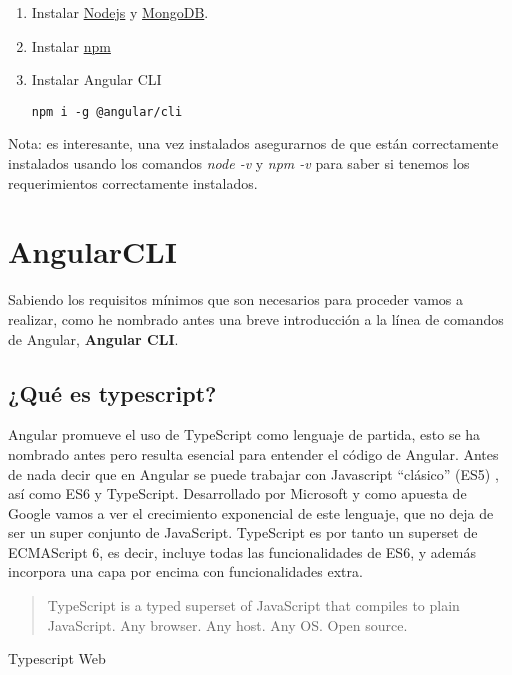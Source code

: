 \begin{enumerate}
	\item Instalar \href{https://nodejs.org/en/}{Nodejs} y \href{https://www.mongodb.com/}{MongoDB}.
	\item Instalar \href{https://www.npmjs.com/}{npm}
	\item Instalar Angular CLI
		\lstset{language=C, breaklines=true, basicstyle=\footnotesize}
		\begin{lstlisting}[frame=single]
		npm i -g @angular/cli
    	\end{lstlisting}
\end{enumerate}

Nota: es interesante, una vez instalados asegurarnos de que están correctamente instalados usando los comandos \emph{node -v} y \emph{npm -v} para saber si tenemos los requerimientos correctamente instalados.


\section{AngularCLI}\label{angularCLI}
Sabiendo los requisitos mínimos que son necesarios para proceder vamos a realizar, como he nombrado antes una breve introducción a la línea de comandos de Angular,  \textbf{Angular CLI}.

\subsection{¿Qué es typescript?}\label{typesript}
Angular  promueve el uso de TypeScript como lenguaje de partida, esto se ha nombrado antes pero resulta esencial para entender el código de Angular. Antes de nada decir que en Angular se puede trabajar con Javascript “clásico” (ES5) \cite{ecma}, así como ES6 y TypeScript. Desarrollado por Microsoft y como apuesta de Google vamos a ver el crecimiento exponencial de este lenguaje, que no deja de ser un super conjunto de JavaScript. 
 TypeScript es por tanto un superset de ECMAScript 6, es decir, incluye todas las funcionalidades de ES6, y además incorpora una capa por encima con funcionalidades extra.

\begin{center}
    \begin{minipage}{0.9\linewidth}
        \vspace{5pt}%
        {\small
        \begin{quote}
            TypeScript is a typed superset of JavaScript that compiles to plain JavaScript. Any browser. Any host. Any OS. Open source.
            \end{quote}
        }
        \begin{flushright}
            Typescript Web \cite{typescript}
        \end{flushright}
        \vspace{5pt}%
    \end{minipage}
\end{center}

